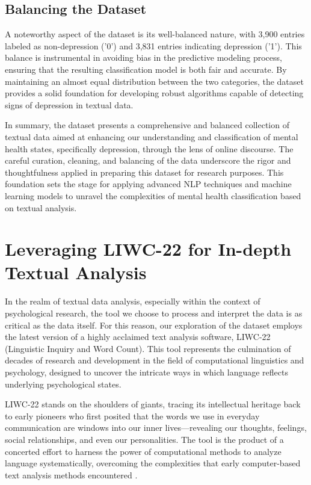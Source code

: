 \subsection{Balancing the Dataset}
\quad A noteworthy aspect of the dataset is its well-balanced nature, with 3,900 entries labeled as non-depression ('0') and 3,831 entries indicating depression ('1'). This balance is instrumental in avoiding bias in the predictive modeling process, ensuring that the resulting classification model is both fair and accurate. By maintaining an almost equal distribution between the two categories, the dataset provides a solid foundation for developing robust algorithms capable of detecting signs of depression in textual data.


In summary, the dataset presents a comprehensive and balanced collection of textual data aimed at enhancing our understanding and classification of mental health states, specifically depression, through the lens of online discourse. The careful curation, cleaning, and balancing of the data underscore the rigor and thoughtfulness applied in preparing this dataset for research purposes. This foundation sets the stage for applying advanced NLP techniques and machine learning models to unravel the complexities of mental health classification based on textual analysis.

\section{Leveraging LIWC-22 for In-depth Textual Analysis}

\quad In the realm of textual data analysis, especially within the context of psychological research, the tool we choose to process and interpret the data is as critical as the data itself. For this reason, our exploration of the dataset employs the latest version of a highly acclaimed text analysis software, LIWC-22 (Linguistic Inquiry and Word Count). This tool represents the culmination of decades of research and development in the field of computational linguistics and psychology, designed to uncover the intricate ways in which language reflects underlying psychological states.

\quad LIWC-22 stands on the shoulders of giants, tracing its intellectual heritage back to early pioneers who first posited that the words we use in everyday communication are windows into our inner lives—revealing our thoughts, feelings, social relationships, and even our personalities. The tool is the product of a concerted effort to harness the power of computational methods to analyze language systematically, overcoming the complexities that early computer-based text analysis methods encountered \cite{boyd2022development}.

